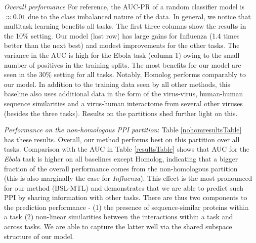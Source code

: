 \documentclass{bioinfo}
\begin{document}
\noindent\textit{Overall performance}
For reference, the AUC-PR of a random classifier model is $\approx 0.01$ due to the class imbalanced nature of the data.
In general, we notice that multitask learning benefits
all tasks. The first three columns show the results in the 10\% setting. 
Our model (last row) has large gains for Influenza (1.4 times better than the next best) and modest improvements for the other tasks.
The variance in the AUC is high for the Ebola task (column 1) owing to the small number of positives 
in the training splits.
The most benefits for our model are seen in the 30\% setting for all tasks.
Notably, Homolog performs comparably to our model. In addition to the training data seen by all other methods, this baseline also uses additional data in the form of the virus-virus, human-human sequence similarities and a virus-human interactome from several other viruses (besides the three tasks). 
Results on the partitions shed further light on this.

\noindent\textit{Performance on the non-homologous PPI partition}:
Table \ref{nohomresultsTable} has these results. Overall, our method performs best on this partition over all tasks.
Comparison with the AUC in Table \ref{resultsTable} shows that AUC for the \textit{Ebola} task is higher on all baselines except Homolog, indicating that
a bigger fraction of the overall performance comes from the non-homologous partition (this is also marginally the case for \textit{Influenza}). 
This effect is the most pronounced for our method (BSL-MTL)
and demonstrates that we are able to predict such PPI by sharing information with other tasks. 
There are thus two components to the prediction performance - (1) the presence of sequence-similar proteins within a task (2) non-linear similarities between the interactions within a task and across tasks. We are able to capture the latter well via the shared subspace structure of our model.


\end{document}
